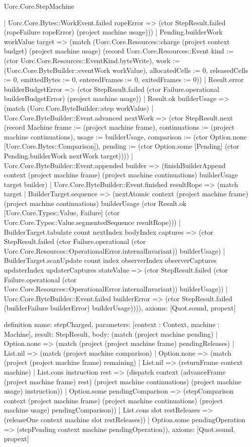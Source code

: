 \begin{lexlean}{Uorc.Core.StepMachine}
\begin{semanticmodule}
{      | Uorc.Core.Bytes::WorkEvent.failed ropeError => (ctor StepResult.failed (ropeFailure ropeError) (project machine usage)))
    | Pending.builderWork workValue target => (match (Uorc.Core.Resources::charge (project context budget) (project machine usage) (record Uorc.Core.Resources::Event {kind := (ctor Uorc.Core.Resources::EventKind.byteWrite), work := (Uorc.Core.ByteBuilder::eventWork workValue), allocatedCells := 0, releasedCells := 0, emittedBytes := 0, enteredFrames := 0, exitedFrames := 0}))
      | Result.error builderBudgetError => (ctor StepResult.failed (ctor Failure.operational builderBudgetError) (project machine usage))
      | Result.ok builderUsage => (match (Uorc.Core.ByteBuilder::step workValue)
        | Uorc.Core.ByteBuilder::Event.advanced nextWork => (ctor StepResult.next (record Machine {frame := (project machine frame), continuations := (project machine continuations), usage := builderUsage, comparison := (ctor Option.none [Uorc.Core.Bytes::Comparison]), pending := (ctor Option.some [Pending] (ctor Pending.builderWork nextWork target))}))
        | Uorc.Core.ByteBuilder::Event.appended builder => (finishBuilderAppend context (project machine frame) (project machine continuations) builderUsage target builder)
        | Uorc.Core.ByteBuilder::Event.finished resultRope => (match target
          | BuilderTarget.sequence => (nextAtomic context (project machine frame) (project machine continuations) builderUsage (ctor Result.ok [Uorc.Core.Types::Value, Failure] (ctor Uorc.Core.Types::Value.segmentedSequence resultRope)))
          | BuilderTarget.tabulate count nextIndex bodyIndex captures => (ctor StepResult.failed (ctor Failure.operational (ctor Uorc.Core.Resources::OperationalError.internalInvariant)) builderUsage)
          | BuilderTarget.scanUpdate count index observerIndex observerCaptures updaterIndex updaterCaptures stateValue => (ctor StepResult.failed (ctor Failure.operational (ctor Uorc.Core.Resources::OperationalError.internalInvariant)) builderUsage))
        | Uorc.Core.ByteBuilder::Event.failed builderError => (ctor StepResult.failed (builderFailure builderError) builderUsage)))),
  axioms: [Quot.sound, propext]
}

definition{
  name: stepCharged,
  parameters: [context : Context, machine : Machine],
  result: StepResult,
  body: (match (project machine pending)
    | Option.none => (match (project (project machine frame) pendingReleases)
      | List.nil => (match (project machine comparison)
        | Option.none => (match (project (project machine frame) remaining)
          | List.nil => (returnFrame context machine)
          | List.cons instruction rest => (dispatch context (advanceFrame (project machine frame) rest) (project machine continuations) (project machine usage) instruction))
        | Option.some pendingComparison => (stepComparison context (project machine frame) (project machine continuations) (project machine usage) pendingComparison))
      | List.cons slot restReleases => (releaseOne context machine slot restReleases))
    | Option.some pendingOperation => (stepPending context machine pendingOperation)),
  axioms: [Quot.sound, propext]
}


\end{semanticmodule}
\end{lexlean}

